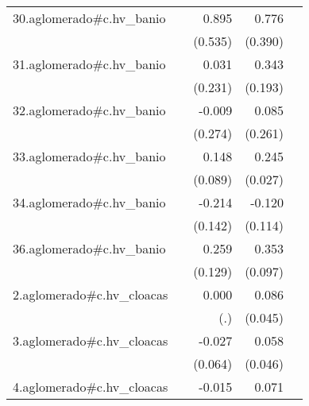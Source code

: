 {\begin{longtable}{l*{4}{D{.}{.}{-1}}}
\addlinespace
30.aglomerado#c.hv\_banio&                     &       0.895         &       0.776\sym{*}  &                     \\
            &                     &     (0.535)         &     (0.390)         &                     \\
\addlinespace
31.aglomerado#c.hv\_banio&                     &       0.031         &       0.343         &                     \\
            &                     &     (0.231)         &     (0.193)         &                     \\
\addlinespace
32.aglomerado#c.hv\_banio&                     &      -0.009         &       0.085         &                     \\
            &                     &     (0.274)         &     (0.261)         &                     \\
\addlinespace
33.aglomerado#c.hv\_banio&                     &       0.148         &       0.245\sym{***}&                     \\
            &                     &     (0.089)         &     (0.027)         &                     \\
\addlinespace
34.aglomerado#c.hv\_banio&                     &      -0.214         &      -0.120         &                     \\
            &                     &     (0.142)         &     (0.114)         &                     \\
\addlinespace
36.aglomerado#c.hv\_banio&                     &       0.259\sym{*}  &       0.353\sym{***}&                     \\
            &                     &     (0.129)         &     (0.097)         &                     \\
\addlinespace
2.aglomerado#c.hv\_cloacas&                     &       0.000         &       0.086         &                     \\
            &                     &         (.)         &     (0.045)         &                     \\
\addlinespace
3.aglomerado#c.hv\_cloacas&                     &      -0.027         &       0.058         &                     \\
            &                     &     (0.064)         &     (0.046)         &                     \\
\addlinespace
4.aglomerado#c.hv\_cloacas&                     &      -0.015         &       0.071         &                     \\

\end{longtable}}
